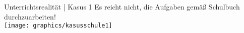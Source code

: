 % 
% 
% 
% 


\begin{frame}
  {Unterrichtsrealität | Kasus 1}
  Es reicht nicht, die Aufgaben gemäß Schulbuch durchzuarbeiten!\\
  \Halbzeile
  \centering 
  \onslide<+->
  \onslide<+->
  \texttt{[image: graphics/kasusschule1]}\\
\end{frame}

